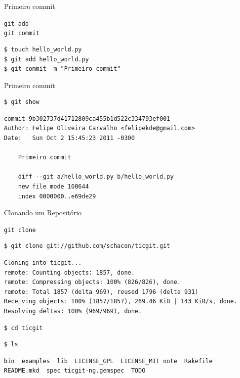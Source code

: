 \documentclass[portuguese,brazil]{beamer}
\begin{document}
\begin{frame}[fragile]{Primeiro commit}
\begin{center}
\texttt{git add}\\
\texttt{git commit}
\end{center}
\begin{verbatim}
$ touch hello_world.py
$ git add hello_world.py
$ git commit -m "Primeiro commit"
\end{verbatim}
\end{frame}

\begin{frame}[fragile]{Primeiro commit}
\small{
\begin{verbatim}
$ git show
\end{verbatim}
\pause
\begin{verbatim}
commit 9b302737d41712809ca455b1d522c334793ef001
Author: Felipe Oliveira Carvalho <felipekde@gmail.com>
Date:   Sun Oct 2 15:45:23 2011 -0300

    Primeiro commit

    diff --git a/hello_world.py b/hello_world.py
    new file mode 100644
    index 0000000..e69de29
\end{verbatim}
}
\end{frame}

\begin{frame}[fragile]{Clonando um Repositório}
\vskip 0pt 
\begin{center}
\texttt{git clone}
\end{center}
\begin{verbatim}
$ git clone git://github.com/schacon/ticgit.git
\end{verbatim}
\pause
\tiny{
\begin{verbatim}
Cloning into ticgit...
remote: Counting objects: 1857, done.
remote: Compressing objects: 100% (826/826), done.
remote: Total 1857 (delta 969), reused 1796 (delta 931)
Receiving objects: 100% (1857/1857), 269.46 KiB | 143 KiB/s, done.
Resolving deltas: 100% (969/969), done.
\end{verbatim}
}
\pause
\small{
\begin{verbatim}
$ cd ticgit
\end{verbatim}
\pause
\begin{verbatim}
$ ls
\end{verbatim}
}
\pause
\tiny{
\begin{verbatim}
bin  examples  lib  LICENSE_GPL  LICENSE_MIT note  Rakefile
README.mkd  spec ticgit-ng.gemspec  TODO
\end{verbatim}
}
\end{frame}
\end{document}
